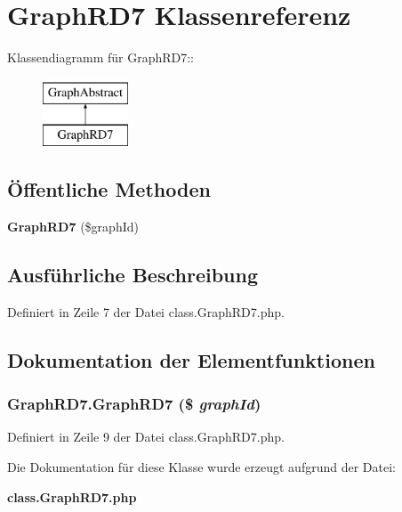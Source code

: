 \section{GraphRD7 Klassenreferenz}
\label{classGraphRD7}
Klassendiagramm für GraphRD7::\begin{figure}[H]
\begin{center}
\leavevmode
\includegraphics[height=2cm]{classGraphRD7}
\end{center}
\end{figure}
\subsection*{Öffentliche Methoden}
\begin{CompactItemize}
\item 
{\bf GraphRD7} (\$graphId)
\end{CompactItemize}


\subsection{Ausführliche Beschreibung}


Definiert in Zeile 7 der Datei class.GraphRD7.php.

\subsection{Dokumentation der Elementfunktionen}
\subsubsection{\setlength{\rightskip}{0pt plus 5cm}GraphRD7.GraphRD7 (\$ {\em graphId})}\label{classGraphRD7_42fd9702d8b35c73f7d9f75baf07452c}




Definiert in Zeile 9 der Datei class.GraphRD7.php.

Die Dokumentation für diese Klasse wurde erzeugt aufgrund der Datei:\begin{CompactItemize}
\item 
{\bf class.GraphRD7.php}\end{CompactItemize}
